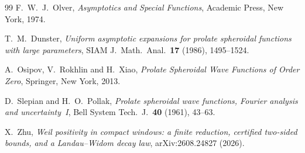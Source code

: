 \documentclass[11pt]{amsart}
\theoremstyle{definition}
\theoremstyle{remark}
\begin{document}
\begin{thebibliography}{99}
 F.~W.~J.~Olver, \emph{Asymptotics and Special Functions}, Academic Press, New York, 1974.

 T.~M.~Dunster, \emph{Uniform asymptotic expansions for prolate spheroidal functions with large
parameters}, SIAM J.\ Math.\ Anal.\ \textbf{17} (1986), 1495--1524.

 A.~Osipov, V.~Rokhlin and H.~Xiao, \emph{Prolate Spheroidal Wave Functions of Order Zero},
Springer, New York, 2013.

 D.~Slepian and H.~O.~Pollak, \emph{Prolate spheroidal wave functions, Fourier analysis and
uncertainty~I}, Bell System Tech.\ J.\ \textbf{40} (1961), 43--63.

 X.~Zhu, \emph{Weil positivity in compact windows: a finite reduction, certified
two-sided bounds, and a Landau--Widom decay law}, arXiv:2608.24827 (2026).

\end{thebibliography}
\end{document}
